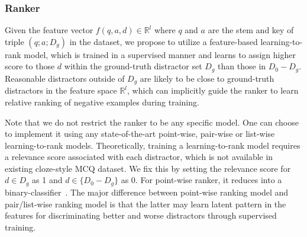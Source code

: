 \subsubsection{Ranker}
\label{sec:AMMR}
Given the feature vector $f(q, a, d)\in \mathbb{R}^l$ where $q$ and 
$a$ are the stem and key of triple $(q; a; D_g)$ in the dataset, 
we propose to utilize a feature-based learning-to-rank model, 
which is trained in a supervised manner and learns to assign higher
score to those $d$ within the ground-truth distractor set $D_g$ 
than those in $D_0-D_g$. Reasonable distractors outside of $D_g$ are likely to be close to ground-truth distractors in the feature space $\mathbb{R}^l$, which can implicitly guide the ranker to learn relative ranking of negative examples during training.

Note that we do not restrict the ranker to be any specific model. 
One can choose to implement it using any state-of-the-art point-wise, 
pair-wise or list-wise learning-to-rank models. Theoretically, 
training a learning-to-rank model requires a relevance score associated with 
each distractor, which is not available in existing cloze-style 
MCQ dataset. We fix this by setting the relevance score for $d\in D_g$ as 1 and $d\in \{D_0-D_g\}$ as 0. For point-wise ranker, 
it reduces into a binary-classifier~\cite{liang2018distractor}. 
The major difference between point-wise ranking model and 
pair/list-wise ranking model is that the latter may learn latent pattern 
in the features for discriminating better and worse distractors 
through supervised training.


